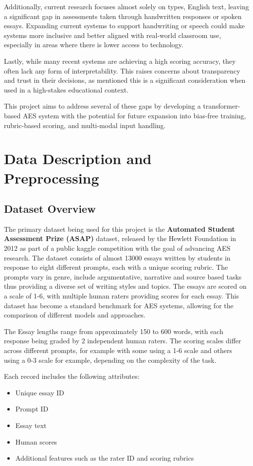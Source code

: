 \documentclass[12pt,a4paper]{report}
\begin{document}
Additionally, current research focuses almost solely on types, English text, leaving a significant gap in assessments taken through handwritten responses or spoken essays. Expanding current systems to support handwriting or speech could make systems more inclusive and better aligned with real-world classroom use, especially in areas where there is lower access to technology.

Lastly, while many recent systems are achieving a high scoring accuracy, they often lack any form of interpretability. This raises concerns about transparency and trust in their decisions, as mentioned this is a significant consideration when used in a high-stakes educational context. 

This project aims to address several of these gaps by developing a transformer-based AES system with the potential for future expansion into bias-free training, rubric-based scoring, and multi-modal input handling.

\chapter{Data Description and Preprocessing}
\section{Dataset Overview}
The primary dataset being used for this project is the \textbf{Automated Student Assessment Prize (ASAP)} dataset, released by the Hewlett Foundation in 2012 as part of a public kaggle competition with the goal of advancing 
AES research. The dataset consists of almost 13000 essays written by students in response to eight different prompts, each with a unique scoring rubric. The prompts vary in genre, include argumentative, narrative and source based tasks thus providing a diverse set 
of writing styles and topics. The essays are scored on a scale of 1-6, with multiple human raters providing scores for each essay. This dataset has become a standard benchmark for AES systems, allowing for the comparison of different models and approaches.

The Essay lengths range from approximately 150 to 600 words, with each response being graded by 2 independent human raters. The scoring scales differ across different prompts, for example with some using a 1-6 scale and others using a 0-3 scale for example, depending on the complexity of the task.

Each record includes the following attributes:
\begin{itemize}
    \item Unique essay ID
    \item Prompt ID
    \item Essay text
    \item Human scores
    \item Additional features such as the rater ID and scoring rubrics
\end{itemize}
\end{document}
